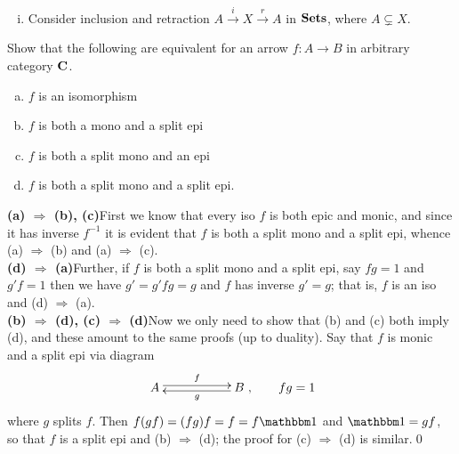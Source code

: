 \begin{bookproblem}
\begin{Solution}
\begin{enumerate}[(i)]
          \item 
            Consider inclusion and retraction \(A \xrightarrow{i} X \xrightarrow{r}
            A\) in \(\mathbf{{Sets}}\), where \(A \subsetneq X\).
        \end{enumerate}
      \end{Solution}
\end{bookproblem}

\begin{bookproblem}
  Show that the following are equivalent for an arrow \(f: A \to B\) in
  arbitrary category \(\mathbf{{C}}\).
  \begin{enumerate}[(a)]
    \item \(f\) is an isomorphism
    \item \(f\) is both a mono and a split epi
    \item \(f\) is both a split mono and an epi
    \item \(f\) is both a split mono and a split epi.
  \end{enumerate}
  \begin{Solution}
    \textbf{(a) \(\Rightarrow\) (b), (c)}\quad First we know that every iso
    \(f\) is both epic and monic, and since it has inverse \(f^{-1}\) it is
    evident that \(f\) is both a split mono and a split epi, whence (a)
    \(\Rightarrow\) (b) and (a) \(\Rightarrow\) (c).\\

    \textbf{(d) \(\Rightarrow\) (a)}\quad Further, if \(f\) is both a split mono
    and a split epi, say \(fg = 1\) and \(g'f = 1\) then we have \(g' = g'fg =
    g\) and \(f\) has inverse \(g' = g\); that is, \(f\) is an iso and (d)
    \(\Rightarrow\) (a).\\

    \textbf{(b) \(\Rightarrow\) (d), (c) \(\Rightarrow\) (d)}\quad Now we only
    need to show that (b) and (c) both imply (d), and these amount to the same
    proofs (up to duality). Say that \(f\) is monic and a split epi via diagram
    \[\xymatrix{A \ar@<.5ex>[rr]^f && B\ar@<.5ex>[ll]^g},\quad\quad fg = 1\]
    where \(g\) splits \(f\). Then \(f(gf) = (fg)f = f = f\id\) and \(\id =
    gf\), so that \(f\) is a split epi and (b) \(\Rightarrow\) (d); the proof
    for (c) \(\Rightarrow\) (d) is similar.\qed{}

  \end{Solution}
\end{bookproblem}

